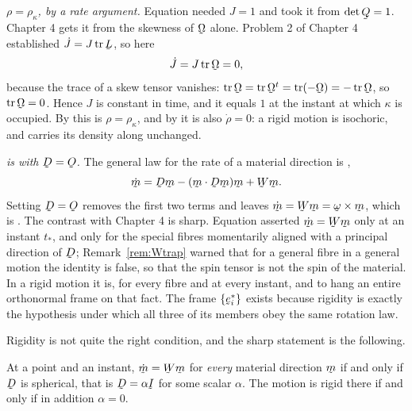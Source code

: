 \emph{$\rho=\rho_{\kappa}$, by a rate argument.} Equation 
needed $J=1$ and took it from $\det\bQ=1$. Chapter 4 gets it from the
skewness of $\bOm$ alone. Problem 2 of Chapter 4 established
$\dot J=J\tr\bL$, so here
\[
   \dot J=J\tr\bOm=0 ,
\]
because the trace of a skew tensor vanishes: $\tr\bOm=\tr\bOm^{t}
=\tr(-\bOm)=-\tr\bOm$, so $\tr\bOm=0$. Hence $J$ is constant in time,
and it equals $1$ at the instant at which $\kappa$ is occupied. By
 this is $\rho=\rho_{\kappa}$, and by  it is also
$\dot\rho=0$: a rigid motion is isochoric, and carries its density along
unchanged.

\emph{ is  with $\bD=\Ob$.} The general law for the
rate of a material direction is ,
\[
   \dot\bm=\bD\bm-(\ip\bm{\bD\bm})\bm+\bW\bm .
\]
Setting $\bD=\Ob$ removes the first two terms and leaves
$\dot\bm=\bW\bm=\bom\times\bm$, which is . The contrast with
Chapter 4 is sharp. Equation  asserted $\dot\bm=\bW\bm$ only at an instant
$t_{*}$, and only for the special fibres momentarily aligned with a
principal direction of $\bD$; Remark~\ref{rem:Wtrap} warned that for a
general fibre in a general motion the identity is false, so that the
spin tensor is not the spin of the material. In a rigid motion it is,
for every fibre and at every instant, and  to  hang
an entire orthonormal frame on that fact. The frame $\{\be^{*}_{i}\}$
exists because rigidity is exactly the hypothesis under which all three
of its members obey the same rotation law.

Rigidity is not quite the right condition, and the sharp statement is
the following.

\begin{proposition}\label{prop:ch6spinfibre}
At a point and an instant, $\dot\bm=\bW\bm$ for \emph{every} material
direction $\bm$ if and only if $\bD$ is spherical, that is
$\bD=\alpha\I$ for some scalar $\alpha$. The motion is rigid there if
and only if in addition $\alpha=0$.
\end{proposition}

